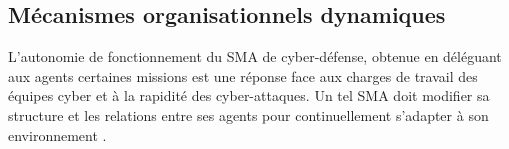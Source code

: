 

\subsection{Mécanismes organisationnels dynamiques}

L'autonomie de fonctionnement du SMA de cyber-défense, obtenue  en déléguant aux agents certaines missions %
est une réponse face aux charges de travail des équipes cyber et à la rapidité des cyber-attaques\cite{ieeesp_KottT20}.
Un tel SMA doit modifier sa structure et les relations entre ses agents pour continuellement s'adapter à son environnement \cite{theron_autonomous_2021}.


